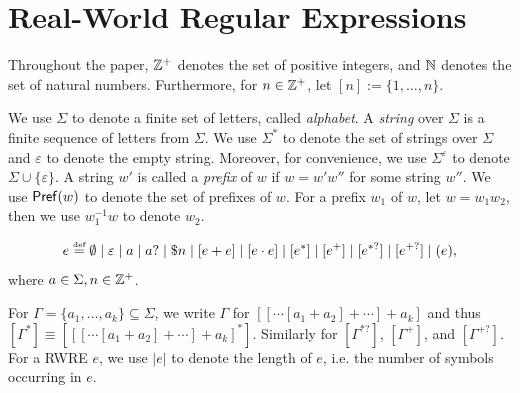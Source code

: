 
\section{Real-World Regular Expressions}\label{sec-rwre}


Throughout the paper, $\mathbb{Z}^+$ denotes the set of positive integers, and  $\mathbb{N}$ denotes the set of natural numbers. Furthermore, for $n\in \mathbb{Z}^+$, let $[n]:=\{1, \ldots, n\}$. 

We use $\Sigma$ to denote a finite set of letters, called \emph{alphabet}. A \emph{string} over $\Sigma$ is a finite sequence of letters from $\Sigma$. We use $\Sigma^*$ to denote the set of strings over $\Sigma$ and $\varepsilon$ to denote the empty string. Moreover, for convenience, we use $\Sigma^\varepsilon$ to denote $\Sigma \cup \{\varepsilon\}$. A string $w'$ is called a \emph{prefix} of $w$ if $w = w'w''$ for some string $w''$. We use $\mathsf{Pref}(w)$ to denote the set of prefixes of $w$. For a prefix $w_1$ of $w$, let $w = w_1 w_2$, then we use $w_1^{-1}w$ to denote $w_2$.


  
\begin{definition}
  	\[e \eqdef \emptyset \mid \varepsilon \mid a \mid a? \mid \$n \mid [e + e] \mid [e \concat e] \mid [e^*] \mid [e^+] \mid [e^{*?}] \mid  [e^{+?}] \mid (e), \]
  	where $a \in \Sigma, n \in \mathbb{Z}^+$. 
\end{definition}
%
For $\Gamma = \{a_1, \ldots, a_k\}\subseteq \Sigma$, we write $\Gamma$ for  $[[\cdots [a_1 + a_2] + \cdots] + a_k]$ and thus $[\Gamma^\ast] \equiv [[[\cdots [a_1 + a_2] + \cdots] + a_k]^\ast]$. Similarly for $[\Gamma^{\ast?}]$, $[\Gamma^+]$, and $[\Gamma^{+?}]$. For a RWRE $e$, we use $|e|$ to denote the length of $e$, i.e. the number of symbols occurring in $e$.

